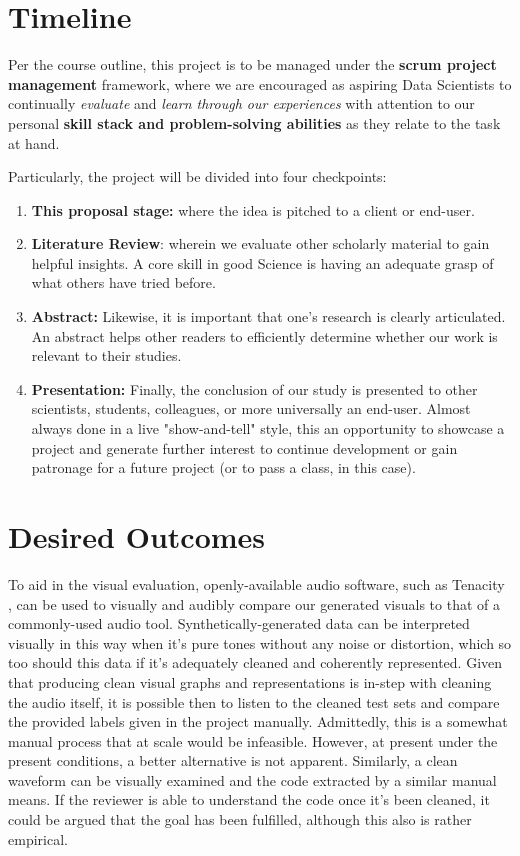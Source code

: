 \documentclass[11pt]{article}
\begin{document}
\section{Timeline}
\label{sec:orgb25297c}
Per the course outline, this project is to be managed under the \textbf{scrum project management} framework,
where we are encouraged as aspiring Data Scientists to continually \emph{evaluate} and \emph{learn through our experiences}
with attention to our personal \textbf{skill stack and problem-solving abilities} as they relate to the task at hand.

Particularly, the project will be divided into four checkpoints:

\begin{enumerate}
\item \textbf{This proposal stage:} where the idea is pitched to a client or end-user.
\item \textbf{Literature Review}: wherein we evaluate other scholarly material to gain helpful insights.
A core skill in good Science is having an adequate grasp of what others have tried before.
\item \textbf{Abstract:} Likewise, it is important that one's research is clearly articulated. An abstract helps
other readers to efficiently determine whether our work is relevant to their studies.
\item \textbf{Presentation:} Finally, the conclusion of our study is presented to other scientists, students, colleagues,
or more universally an end-user. Almost always done in a live "show-and-tell" style, this an opportunity to showcase
a project and generate further interest to continue development or gain patronage for a future project (or to pass a class, in this case).
\end{enumerate}
\section{Desired Outcomes}
\label{sec:org47efe15}
To aid in the visual evaluation, openly-available audio software, such as Tenacity \autocite{tenacityFOSS}, can be used to visually and audibly compare our generated
visuals to that of a commonly-used audio tool. Synthetically-generated data can be interpreted visually in this way when it's pure tones without any noise or distortion,
which so too should this data if it's adequately cleaned and coherently represented. Given that producing clean visual graphs and representations is in-step with
cleaning the audio itself, it is possible then to listen to the cleaned test sets and compare the provided labels given in the project manually. Admittedly, this is a somewhat
manual process that at scale would be infeasible. However, at present under the present conditions, a better alternative is not apparent. Similarly, a clean waveform can be visually
examined and the code extracted by a similar manual means. If the reviewer is able to understand the code once it's been cleaned, it could be argued that the goal has been fulfilled,
although this also is rather empirical.
\end{document}
